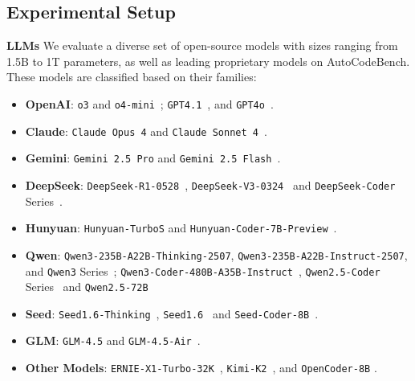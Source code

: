 \subsection{Experimental Setup}

\textbf{LLMs} We evaluate a diverse set of open-source models with sizes ranging from 1.5B to 1T parameters, as well as leading proprietary models on AutoCodeBench. These models are classified based on their families:

\begin{itemize}
    \item \textbf{OpenAI}: \texttt{o3} and \texttt{o4-mini}~\citep{o3}; \texttt{GPT4.1}~\citep{GPT-4.1}, and \texttt{GPT4o}~\citep{gpt4o}.

    \item \textbf{Claude}: \texttt{Claude Opus 4} and \texttt{Claude Sonnet 4}~\citep{claude4}.

    \item \textbf{Gemini}: \texttt{Gemini 2.5 Pro} and \texttt{Gemini 2.5 Flash}~\citep{gemini2.5}.

    \item \textbf{DeepSeek}: \texttt{DeepSeek-R1-0528}~\citep{deepseekai2025deepseekr1}, \texttt{DeepSeek-V3-0324}~\citep{deepseek_v3} and \texttt{DeepSeek-Coder} Series~\citep{deepseekai2024deepseekcoderv2,guo2024deepseekcoder}.

    \item \textbf{Hunyuan}: \texttt{Hunyuan-TurboS} and \texttt{Hunyuan-Coder-7B-Preview}~\citep{tencenthunyuanteam2025hunyuanturbos}.

    \item \textbf{Qwen}: \texttt{Qwen3-235B-A22B-Thinking-2507}, \texttt{Qwen3-235B-A22B-Instruct-2507}, and \texttt{Qwen3} Series~\citep{yang2025qwen3}; \texttt{Qwen3-Coder-480B-A35B-Instruct}~\citep{qwen3coder}, \texttt{Qwen2.5-Coder} Series~\citep{hui2024qwen25codertechnicalreport} and \texttt{Qwen2.5-72B}~\citep{qwen2025qwen25technicalreport}

    \item \textbf{Seed}: \texttt{Seed1.6-Thinking}~\citep{seed1.6}, \texttt{Seed1.6}~\citep{seed1.6} and \texttt{Seed-Coder-8B}~\citep{seed2025seedcoderletcodemodel}.

    \item \textbf{GLM}: \texttt{GLM-4.5} and \texttt{GLM-4.5-Air}~\citep{glm4p5}.

    \item \textbf{Other Models}: \texttt{ERNIE-X1-Turbo-32K}~\citep{erniex1}, \texttt{Kimi-K2}~\citep{kimiteam2025kimik2openagentic}, and \texttt{OpenCoder-}\texttt{8B} \citep{huang2025opencoderopencookbooktoptier}.
\end{itemize}


